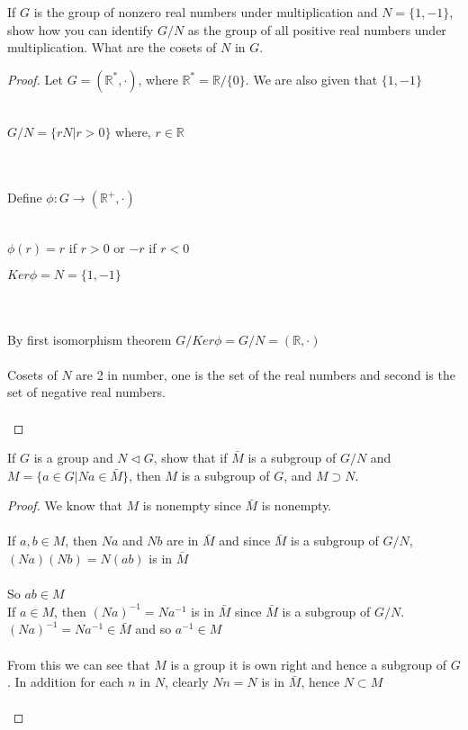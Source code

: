 \documentclass[12pt]{article}
\newenvironment{problem}[2][Problem]{\begin{trivlist}
\item[\hskip \labelsep {\bfseries #1}\hskip \labelsep {\bfseries #2.}]}{\end{trivlist}}
\begin{document}
\begin{problem}{2.6.2}
If $G$ is the group of nonzero real numbers under multiplication and $N = \{1, -1\}$, show how you can identify $G/N$ as the group of all positive real numbers under multiplication. What are the cosets of $N$ in $G$.
\end{problem}

\begin{proof}
Let $G = (\mathbb{R}^*,\cdot)$, where $\mathbb{R}^* = \mathbb{R}/ \{0\}$. We are also given that $\{ 1, -1 \}$ \\ \\
\centerline{ $G/N = \{ rN | r >0 \}$ where, $r \in \mathbb{R}$} \\ \\ 
Define $\phi : G \rightarrow (\mathbb{R}^+, \cdot)$ \\ \\
\centerline{$\phi (r) = r$ if $r >0$ or $-r$ if $r<0$}
\centerline{$Ker \phi = N = \{1,-1\}$} \\ \\
By first isomorphism theorem $G/ Ker\phi = G/N = (\mathbb{R}, \cdot)$ \\ \\
Cosets of $N$ are 2 in number, one is the set of the real numbers and second is the set of negative real numbers. \\ \\
\end{proof}

\begin{problem}{2.6.3}
If $G$ is a group and $N \triangleleft G$, show that if $\bar{M}$ is a subgroup of $G/N$ and $M = \{ a \in G | Na \in \bar{M} \}$, then $M$ is a subgroup of $G$, and $M \supset N$.
\end{problem}

\begin{proof}
We know that $M$ is nonempty since $\bar{M}$ is nonempty. \\ \\
If $a,b \in M$, then $Na$ and $Nb$ are in $\bar{M}$ and since $\bar{M}$ is a subgroup of $G/N$, $(Na)(Nb) = N(ab)$ is in $\bar{M}$ \\ \\
So $ab \in M$ \\ 
If $a \in M$, then $(Na)^{-1}=Na^{-1}$ is in $\bar{M}$ since $\bar{M}$ is a subgroup of $G/N$. $(Na)^{-1}=Na^{-1} \in \bar{M}$ and so $a^{-1} \in M$ \\ \\
From this we can see that $M$ is a group it is own right and hence a subgroup of $G$. In addition for each $n$ in $N$, clearly $Nn = N$ is in $\bar{M}$, hence $N \subset M$ \\ \\
\end{proof}
 
\end{document}

